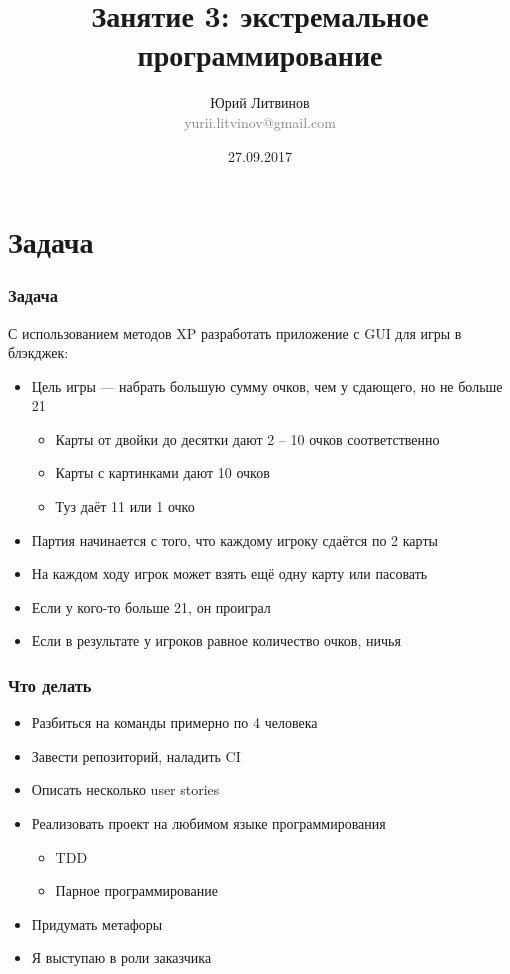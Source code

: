 \documentclass[xetex,mathserif,serif]{beamer}
\title{Занятие 3: экстремальное программирование}
\author[Юрий Литвинов]{Юрий Литвинов\\\small{\textcolor{gray}{yurii.litvinov@gmail.com}}}
\date{27.09.2017}
\begin{document}
	\frame{\titlepage}

	\section{Задача}

	\begin{frame}
		\frametitle{Задача}
		С использованием методов XP разработать приложение с GUI для игры в блэкджек:
		\begin{itemize}
			\item Цель игры --- набрать большую сумму очков, чем у сдающего, но не больше 21
			\begin{itemize}
				\item Карты от двойки до десятки дают 2 -- 10 очков соответственно
				\item Карты с картинками дают 10 очков
				\item Туз даёт 11 или 1 очко
			\end{itemize}
			\item Партия начинается с того, что каждому игроку сдаётся по 2 карты
			\item На каждом ходу игрок может взять ещё одну карту или пасовать
			\item Если у кого-то больше 21, он проиграл
			\item Если в результате у игроков равное количество очков, ничья
		\end{itemize}
	\end{frame}

	\begin{frame}
		\frametitle{Что делать}
		\begin{itemize}
			\item Разбиться на команды примерно по 4 человека
			\item Завести репозиторий, наладить CI
			\item Описать несколько user stories
			\item Реализовать проект на любимом языке программирования
			\begin{itemize}
				\item TDD
				\item Парное программирование
			\end{itemize}
			\item Придумать метафоры
			\item Я выступаю в роли заказчика
		\end{itemize}
	\end{frame}
\end{document}
